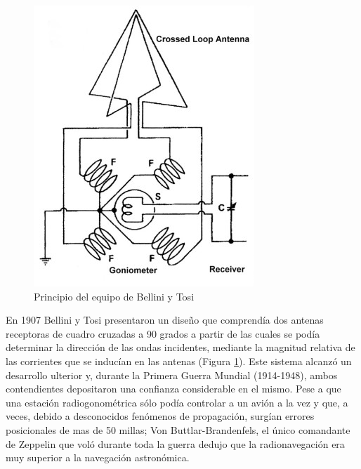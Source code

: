 \begin{figure} \centering
  \includegraphics[keepaspectratio,width=\linewidth]{Imagenes/06.02.vor.imagenes/bellinitosiprinciple.jpg}\caption{Principio del equipo de Bellini y Tosi}
\label{fig:bellini.y.tosi.principio}
\end{figure}

En 1907 Bellini y Tosi presentaron un dise\~no que comprend\'ia dos antenas receptoras de cuadro cruzadas a 90 grados a partir de las cuales se pod\'ia determinar la direcci\'on de las ondas incidentes, mediante la magnitud relativa de las corrientes que se induc\'ian en las antenas (Figura \ref{fig:bellini.y.tosi.principio}). Este sistema alcanz\'o un desarrollo ulterior y, durante la Primera Guerra Mundial (1914-1948), ambos contendientes depositaron una confianza considerable en el mismo. Pese a que una estaci\'on radiogonom\'etrica s\'olo pod\'ia controlar a un avi\'on a la vez y que, a veces, debido a desconocidos fen\'omenos de propagaci\'on, surg\'ian errores posicionales de mas de 50 millas; Von Buttlar-Brandenfels, el \'unico comandante de Zeppelin que vol\'o durante toda la guerra dedujo que la radionavegaci\'on era muy superior a la navegaci\'on astron\'omica.


